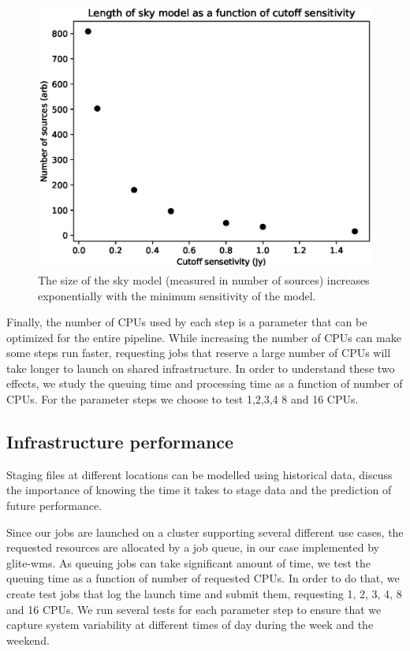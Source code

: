 \begin{figure}
    \includegraphics[width=0.95\linewidth]{figures/skymodel_size_vs_Jy.eps}
      \caption{The size of the sky model (measured in number of sources) increases exponentially with the minimum sensitivity of the model.   }
	\label{fig:skymodel_size}
\end{figure}


Finally, the number of CPUs used by each step is a parameter that can be optimized for the entire pipeline. While increasing the number of CPUs can make some steps run faster, requesting jobs that reserve a large number of CPUs will take longer to launch on shared infrastructure. In order to understand these two effects, we study the queuing time and processing time as a function of number of CPUs. For the parameter steps we choose to test 1,2,3,4 8 and 16 CPUs. 

\subsection{Infrastructure performance}
Staging files at different locations can be modelled using historical data, discuss the importance of knowing the time it takes to stage data and the prediction of future performance. 

Since our jobs are launched on a cluster supporting several different use cases, the requested resources are allocated by a job queue, in our case implemented by glite-wms. As queuing jobs can take significant amount of time, we test the queuing time as a function of number of requested CPUs. In order to do that, we create test jobs that log the launch time and submit them, requesting 1, 2, 3, 4, 8 and 16 CPUs. We run several tests for each parameter step to ensure that we capture system variability at different times of day during the week and the weekend. 

